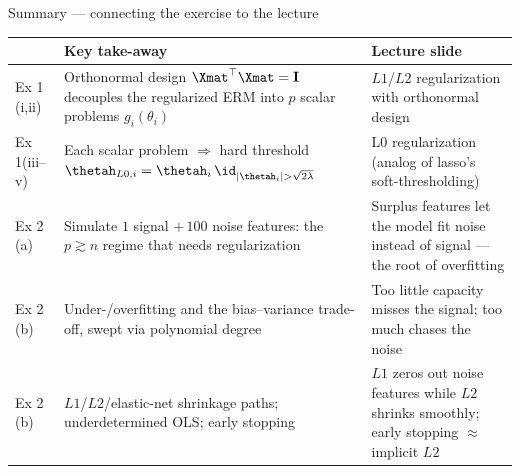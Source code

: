\documentclass[aspectratio=169]{beamer}
\newcommand{\Imat}{\mathbf{I}}
\begin{document}
\begin{frame}{Summary --- connecting the exercise to the lecture}
	\small
	\begin{center}
	\renewcommand{\arraystretch}{1.18}
	\begin{tabular}{@{}p{}p{}p{}@{}}
		\toprule
		& \textbf{Key take-away} & \textbf{Lecture slide} \\
		\midrule
		Ex 1 (i,ii) & Orthonormal design $\Xmat^\top\Xmat = \Imat$ decouples the regularized ERM into $p$ scalar problems $g_i(\theta_i)$ & $L1$/$L2$ regularization with orthonormal design \\
		Ex 1\newline(iii--v) & Each scalar problem $\Rightarrow$ hard threshold $\thetah_{L0,i} = \thetah_i\,\id_{|\thetah_i| > \sqrt{2\lambda}}$ & L0 regularization (analog of lasso's soft-thresholding) \\
		Ex 2 (a) & Simulate $1$ signal $+\,100$ noise features: the $p \gtrsim n$ regime that needs regularization & Surplus features let the model fit noise instead of signal --- the root of overfitting \\
		Ex 2 (b) & Under-/overfitting and the bias--variance trade-off, swept via polynomial degree & Too little capacity misses the signal; too much chases the noise \\
		Ex 2 (b) & $L1$/$L2$/elastic-net shrinkage paths; underdetermined OLS; early stopping & $L1$ zeros out noise features while $L2$ shrinks smoothly; early stopping $\approx$ implicit $L2$ \\
		\bottomrule
	\end{tabular}
	\end{center}
\end{frame}
\end{document}
